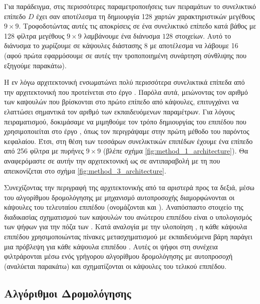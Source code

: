 Για παράδειγμα, στις περισσότερες παραμετροποιήσεις των πειραμάτων το συνελικτικό επίπεδο $D$ έχει σαν αποτέλεσμα τη δημιουργία 128 χαρτών χαρακτηριστικών μεγέθους $9 \times 9$. Τροφοδοτώντας αυτές τις αποκρίσεις σε ένα συνελικτικό επίπεδο κατά βάθος με 128 φίλτρα μεγέθους $9 \times 9$ λαμβάνουμε ένα διάνυσμα $128$ στοιχείων. Αυτό το διάνυσμα το χωρίζουμε σε κάψουλες διάστασης 8 με αποτέλεσμα να λάβουμε 16  (αφού πρώτα εφαρμόσουμε σε αυτές την τροποποιημένη συνάρτηση σύνθλιψης που εξηγούμε παρακάτω).\par

Η εν λόγω αρχιτεκτονική ενσωματώνει πολύ περισσότερα συνελικτικά επίπεδα από την αρχιτεκτονική που προτείνεται στο έργο \cite{sabour2017dynamic}. Παρόλα αυτά, μειώνοντας τον αριθμό των καψουλών που βρίσκονται στο πρώτο επίπεδο από κάψουλες, επιτυγχάνει να ελαττώσει σημαντικά τον αριθμό των εκπαιδευόμενων παραμέτρων. Για λόγους πειραματισμού, δοκιμάσαμε να μιμηθούμε τον τρόπο δημιουργίας του επιπέδου  που χρησιμοποιείται στο έργο \cite{sabour2017dynamic}, όπως τον περιγράψαμε στην πρώτη μέθοδο του παρόντος κεφαλαίου. Έτσι, στη θέση των τεσσάρων συνελικτικών επιπέδων έχουμε ένα επίπεδο από 256 φίλτρα με πυρήνες $9 \times 9$ (βλέπε σχήμα \ref{fig:method_1_architecture}). Θα αναφερόμαστε σε αυτήν την αρχιτεκτονική ως  σε αντιπαραβολή με τη  που απεικονίζεται στο σχήμα \ref{fig:method_3_architecture}.\par

Συνεχίζοντας την περιγραφή της αρχιτεκτονικής από τα αριστερά προς τα δεξιά, μέσω του αλγορίθμου δρομολόγησης με μηχανισμό αυτο\textendash προσοχής διαμορφώνονται οι κάψουλες του τελευταίου επιπέδου (ονομάζονται και ). Αναπόσπαστο στοιχείο της διαδικασίας σχηματισμού των καψουλών του ανώτερου επιπέδου είναι ο υπολογισμός των ψήφων για την πόζα των . Κατά αναλογία με την υλοποίηση \cite{sabour2017dynamic}, η κάθε κάψουλα επιπέδου  χρησιμοποιώντας πίνακες μετασχηματισμού με εκπαιδευόμενα βάρη παράγει μια πρόβλεψη για κάθε κάψουλα επιπέδου . Αυτές οι ψήφοι στη συνέχεια φιλτράρονται μέσω ενός γρήγορου αλγορίθμου δρομολόγησης με αυτο\textendash προσοχή (αναλύεται παρακάτω) και σχηματίζονται οι κάψουλες του τελικού επιπέδου.

\subsection{Αλγόριθμοι Δρομολόγησης}

